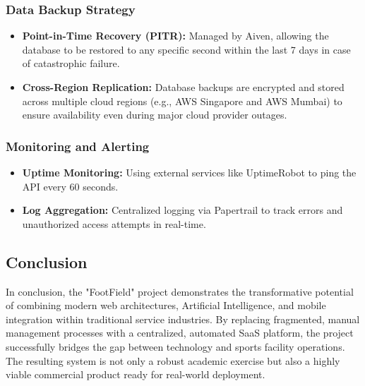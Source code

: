 \subsubsection{Data Backup Strategy}
\begin{itemize}
    \item \textbf{Point-in-Time Recovery (PITR):} Managed by Aiven, allowing the database to be restored to any specific second within the last 7 days in case of catastrophic failure.
    \item \textbf{Cross-Region Replication:} Database backups are encrypted and stored across multiple cloud regions (e.g., AWS Singapore and AWS Mumbai) to ensure availability even during major cloud provider outages.
\end{itemize}

\subsubsection{Monitoring and Alerting}
\begin{itemize}
    \item \textbf{Uptime Monitoring:} Using external services like UptimeRobot to ping the API every 60 seconds.
    \item \textbf{Log Aggregation:} Centralized logging via Papertrail to track errors and unauthorized access attempts in real-time.
\end{itemize}

\subsection{Conclusion}
In conclusion, the "FootField" project demonstrates the transformative potential of combining modern web architectures, Artificial Intelligence, and mobile integration within traditional service industries. By replacing fragmented, manual management processes with a centralized, automated SaaS platform, the project successfully bridges the gap between technology and sports facility operations. The resulting system is not only a robust academic exercise but also a highly viable commercial product ready for real-world deployment.